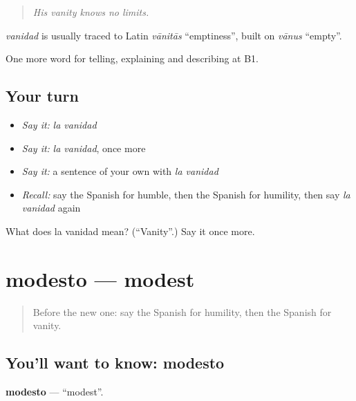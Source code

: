 \begin{quote}
\emph{His vanity knows no limits.}
\end{quote}

\begin{cousinweb}
\emph{vanidad} is usually traced to Latin \emph{vānitās} \textquotedblleft{}emptiness\textquotedblright{}, built on \emph{vānus} \textquotedblleft{}empty\textquotedblright{}.
\end{cousinweb}

\begin{grammarlens}[title={What you've built}]
One more word for telling, explaining and describing at B1.
\end{grammarlens}

\subsection*{Your turn}
\begin{itemize}
\raggedright
  \item \emph{Say it:} \emph{la vanidad}
  \item \emph{Say it:} \emph{la vanidad}, once more
  \item \emph{Say it:} a sentence of your own with \emph{la vanidad}
  \item \emph{Recall:} say the Spanish for humble, then the Spanish for humility, then say \emph{la vanidad} again
\end{itemize}

\begin{tcolorbox}[breakable,colback=teal!4,colframe=teal!35!black,title={Before you move on}]
What does la vanidad mean? (\textquotedblleft{}Vanity\textquotedblright{}.) Say it once more.
\end{tcolorbox}
\section[modesto]{modesto — modest}

\label{lesson:ES-C726-modesto}



\begin{quote}
Before the new one: say the Spanish for humility, then the Spanish for vanity.
\end{quote}

\subsection*{You'll want to know: modesto}
\textbf{modesto} — \textquotedblleft{}modest\textquotedblright{}.

